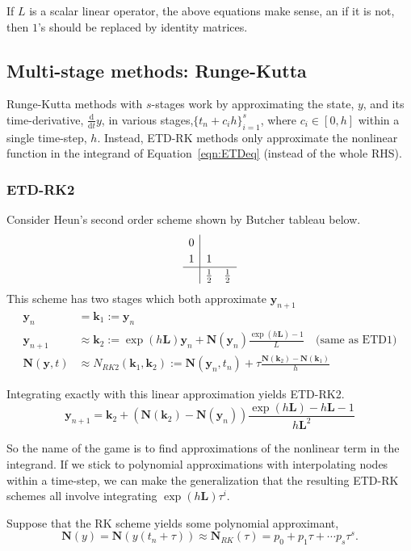 \documentclass{article}
\newcommand{\bb}[1]{\mathbf{#1}}
\newcommand{\ddt}{\frac{\mathrm{d}}{\mathrm{d}t}}
\theoremstyle{definition}
\begin{document}
If $L$ is a scalar linear operator, the above equations make sense, an if it is not, then $1$'s should be replaced by identity matrices. 

\subsection{Multi-stage methods: Runge-Kutta}
Runge-Kutta methods with $s$-stages work by approximating the state, $y$, and its time-derivative, $\ddt y$, in various stages,$\{t_n + c_i h\}_{i=1}^s$, where $ c_i\in [0,h]$  within a single time-step, $h$.
Instead, ETD-RK methods only approximate the nonlinear function in the integrand of Equation~\ref{eqn:ETDeq} (instead of the whole RHS).

\subsubsection{ETD-RK2}
Consider Heun's second order scheme shown by Butcher tableau below.
\[
\renewcommand\arraystretch{1.2}
\begin{array}
{c|cccc}
0& &\\
1& 1 &\\
\hline
& \frac{1}{2} &\frac{1}{2} 
\end{array}
\]
This scheme has two stages which both approximate $\bb{y}_{n+1}$
\begin{align}
\bb{y}_n &= \bb{k}_1:=\bb{y}_n\\ 
\bb{y}_{n+1}&\approx \bb{k}_2 := \exp(h\bb{L})\bb{y}_n + \bb{N}(\bb{y}_n) \frac{\exp(h\bb{L})-1}{L} \quad\text{(same as ETD1)}\\
\bb{N}(\bb{y},t) &\approx N_{RK2}(\bb{k}_1, \bb{k}_2):= \bb{N}(\bb{y}_n,t_n)+ \tau \frac{\bb{N}(\bb{k}_2) - \bb{N}(\bb{k}_1)}{h} \label{eqn:ETDRK2}
\end{align}

Integrating exactly with this linear approximation yields ETD-RK2. 
\begin{equation}
\bb{y}_{n+1} = \bb{k}_2 + (\bb{N}(\bb{k}_2)-\bb{N}(\bb{y}_n))\frac{\exp(h\bb{L})-h\bb{L}-1}{h\bb{L}^2}
\end{equation}

So the name of the game is to find approximations of the nonlinear term in the integrand.
If we stick to polynomial approximations with interpolating nodes within a time-step, we can make the generalization that the resulting ETD-RK schemes all involve integrating $\exp(h\bb{L})\tau^i$. 

Suppose that the RK scheme yields some polynomial approximant, $$\bb{N}(y) = \bb{N}(y(t_n+\tau)) \approx \bb{N}_{RK}(\tau) = p_0 + p_1\tau + \cdots p_s \tau^s.$$
\end{document}
